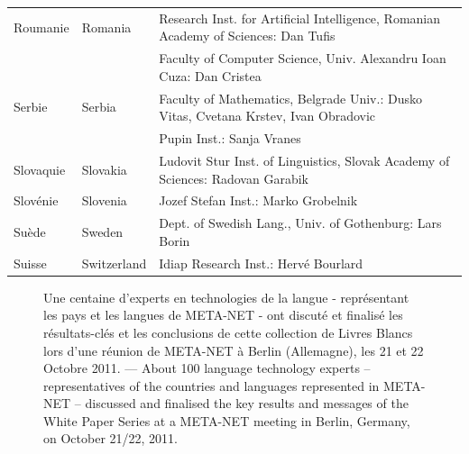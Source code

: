 \begin{longtable}{llp{105mm}}
  Roumanie & \textcolor{grey1}{Romania} & Research Inst. for Artificial Intelligence, Romanian Academy of Sciences: Dan Tufis \\ \addlinespace
  & & Faculty of Computer Science, Univ. Alexandru Ioan Cuza: Dan Cristea \\ \addlinespace

  Serbie & \textcolor{grey1}{Serbia} & Faculty of Mathematics, Belgrade Univ.: Dusko Vitas, Cvetana Krstev, Ivan Obradovic \\ \addlinespace
  & & Pupin Inst.: Sanja Vranes \\ \addlinespace  

  Slovaquie & \textcolor{grey1}{Slovakia} & Ludovit Stur Inst. of Linguistics, Slovak Academy of Sciences: Radovan Garabik \\ \addlinespace 

  Slovénie & \textcolor{grey1}{Slovenia} & Jozef Stefan Inst.: Marko Grobelnik \\ \addlinespace 

  Suède & \textcolor{grey1}{Sweden} & Dept. of Swedish Lang., Univ. of Gothenburg: Lars Borin \\ \addlinespace 

  Suisse & \textcolor{grey1}{Switzerland} & Idiap Research Inst.: Hervé Bourlard 
\end{longtable}
\normalsize

\renewcommand*{\figureformat}{}
\renewcommand*{\captionformat}{}

\begin{figure}[htbp]
  \center
  \caption{ Une centaine d'experts en technologies de la langue -
    représentant les pays et les langues de META-NET - ont discuté et
    finalisé les résultats-clés et les conclusions de cette
    collection de Livres Blancs lors d'une réunion de META-NET à
    Berlin (Allemagne), les 21 et 22 Octobre 2011. --- \textcolor{grey1}{About
      100 language technology experts -- representatives of the
      countries and languages represented in META-NET -- discussed and
      finalised the key results and messages of the White Paper Series
      at a META-NET meeting in Berlin, Germany, on October 21/22,
      2011.}}
 \medskip
\end{figure}

\cleardoublepage

